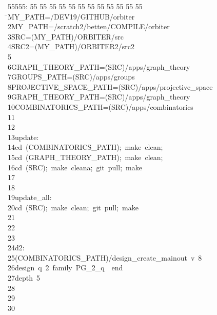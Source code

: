 %
%
\begin{tabbing}
55555: \= 55 \= 55 \= 55 \= 55 \= 55 \= 55 \= 55 \= 55 \= 55 \= 55 \= 55 \= 55 \= \>MY\_PATH=/DEV19/GITHUB/orbiter\\[0pt]
2\>MY\_PATH=/scratch2/betten/COMPILE/orbiter\\[0pt]
3\>SRC=(MY\_PATH)/ORBITER/src\\[0pt]
4\>SRC2=(MY\_PATH)/ORBITER2/src2\\[0pt]
5\>\\[0pt]
6\>GRAPH\_THEORY\_PATH=(SRC)/apps/graph\_theory\\[0pt]
7\>GROUPS\_PATH=(SRC)/apps/groups\\[0pt]
8\>PROJECTIVE\_SPACE\_PATH=(SRC)/apps/projective\_space\\[0pt]
9\>GRAPH\_THEORY\_PATH=(SRC)/apps/graph\_theory\\[0pt]
10\>COMBINATORICS\_PATH=(SRC)/apps/combinatorics\\[0pt]
11\>\\[0pt]
12\>\\[0pt]
13\>update:\\[0pt]
14\>\>cd\ (COMBINATORICS\_PATH);\ make\ clean;\\[0pt]
15\>\>cd\ (GRAPH\_THEORY\_PATH);\ make\ clean;\\[0pt]
16\>\>cd\ (SRC);\ make\ cleana;\ git\ pull;\ make\ \\[0pt]
17\>\\[0pt]
18\>\\[0pt]
19\>update\_all:\\[0pt]
20\>\>cd\ (SRC);\ make\ clean;\ git\ pull;\ make\ \\[0pt]
21\>\\[0pt]
22\>\\[0pt]
23\>\\[0pt]
24\>d2:\\[0pt]
25\>\>(COMBINATORICS\_PATH)/design\_create\_mainout\ v\ 8\ \ \\[0pt]
26\>\>\>design\ q\ 2\ family\ PG\_2\_q\ \ end\ \\[0pt]
27\>\>\>depth\ 5\\[0pt]
28\>\\[0pt]
29\>\\[0pt]
30\>\\[0pt]

\end{tabbing}
